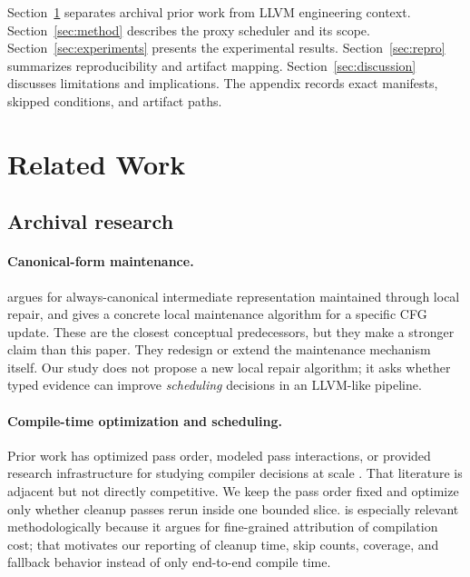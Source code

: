 \documentclass{article}
\begin{document}
Section~\ref{sec:related} separates archival prior work from LLVM engineering context. Section~\ref{sec:method} describes the proxy scheduler and its scope. Section~\ref{sec:experiments} presents the experimental results. Section~\ref{sec:repro} summarizes reproducibility and artifact mapping. Section~\ref{sec:discussion} discusses limitations and implications. The appendix records exact manifests, skipped conditions, and artifact paths.

\section{Related Work}
\label{sec:related}

\subsection{Archival research}

\paragraph{Canonical-form maintenance.}
\citet{fritz2018waddle} argues for always-canonical intermediate representation maintained through local repair, and \citet{fritz2018canonical} gives a concrete local maintenance algorithm for a specific CFG update. These are the closest conceptual predecessors, but they make a stronger claim than this paper. They redesign or extend the maintenance mechanism itself. Our study does not propose a new local repair algorithm; it asks whether typed evidence can improve \emph{scheduling} decisions in an LLVM-like pipeline.

\paragraph{Compile-time optimization and scheduling.}
Prior work has optimized pass order, modeled pass interactions, or provided research infrastructure for studying compiler decisions at scale \citep{liu2024efficient,liang2023learning,trofin2021mlgo,cummins2022compilergym}. That literature is adjacent but not directly competitive. We keep the pass order fixed and optimize only whether cleanup passes rerun inside one bounded slice. \citet{huemer2024closer} is especially relevant methodologically because it argues for fine-grained attribution of compilation cost; that motivates our reporting of cleanup time, skip counts, coverage, and fallback behavior instead of only end-to-end compile time.
\end{document}
